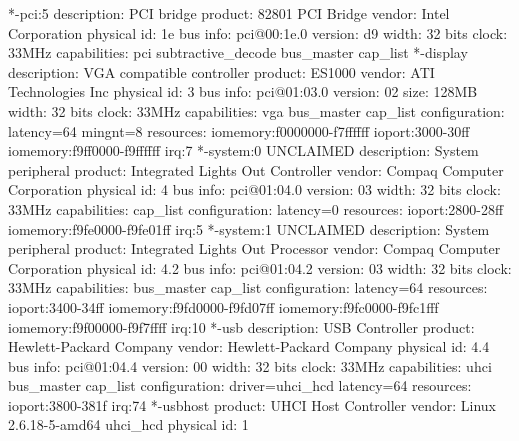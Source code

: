 \documentclass[mingoth,a4paper]{jsarticle}
\begin{document}
{{{{{{{{{\begin{commandline}
        *-pci:5
             description: PCI bridge
             product: 82801 PCI Bridge
             vendor: Intel Corporation
             physical id: 1e
             bus info: pci@00:1e.0
             version: d9
             width: 32 bits
             clock: 33MHz
             capabilities: pci subtractive_decode bus_master cap_list
           *-display
                description: VGA compatible controller
                product: ES1000
                vendor: ATI Technologies Inc
                physical id: 3
                bus info: pci@01:03.0
                version: 02
                size: 128MB
                width: 32 bits
                clock: 33MHz
                capabilities: vga bus_master cap_list
                configuration: latency=64 mingnt=8
                resources: iomemory:f0000000-f7ffffff ioport:3000-30ff iomemory:f9ff0000-f9ffffff irq:7
           *-system:0 UNCLAIMED
                description: System peripheral
                product: Integrated Lights Out Controller
                vendor: Compaq Computer Corporation
                physical id: 4
                bus info: pci@01:04.0
                version: 03
                width: 32 bits
                clock: 33MHz
                capabilities: cap_list
                configuration: latency=0
                resources: ioport:2800-28ff iomemory:f9fe0000-f9fe01ff irq:5
           *-system:1 UNCLAIMED
                description: System peripheral
                product: Integrated Lights Out  Processor
                vendor: Compaq Computer Corporation
                physical id: 4.2
                bus info: pci@01:04.2
                version: 03
                width: 32 bits
                clock: 33MHz
                capabilities: bus_master cap_list
                configuration: latency=64
                resources: ioport:3400-34ff iomemory:f9fd0000-f9fd07ff iomemory:f9fc0000-f9fc1fff iomemory:f9f00000-f9f7ffff irq:10
           *-usb
                description: USB Controller
                product: Hewlett-Packard Company
                vendor: Hewlett-Packard Company
                physical id: 4.4
                bus info: pci@01:04.4
                version: 00
                width: 32 bits
                clock: 33MHz
                capabilities: uhci bus_master cap_list
                configuration: driver=uhci_hcd latency=64
                resources: ioport:3800-381f irq:74
              *-usbhost
                   product: UHCI Host Controller
                   vendor: Linux 2.6.18-5-amd64 uhci_hcd
                   physical id: 1

\end{commandline}}}}}}}}}}
\end{document}
